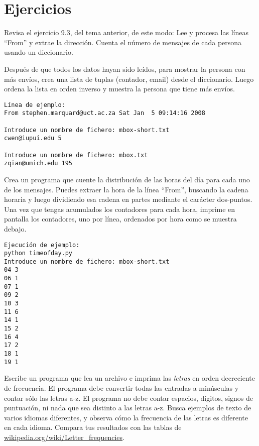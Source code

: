 \section{Ejercicios}

\begin{ex}
Revisa el ejercicio 9.3, del tema anterior, de este modo:
Lee y procesa las líneas ``From'' y extrae la
dirección. Cuenta el número de
mensajes de cada persona usando un diccionario.
	
Después de que todos los datos hayan sido leídos, para mostrar
la persona con más envíos, crea
una lista de tuplas (contador, email) desde el
diccionario. Luego ordena la lista en orden
inverso y muestra la persona que tiene más
envíos.

\beforeverb
\begin{verbatim}
Línea de ejemplo:
From stephen.marquard@uct.ac.za Sat Jan  5 09:14:16 2008

Introduce un nombre de fichero: mbox-short.txt
cwen@iupui.edu 5

Introduce un nombre de fichero: mbox.txt
zqian@umich.edu 195
\end{verbatim}
\afterverb
\end{ex}
\begin{ex}
Crea un programa que cuente la distribución de las horas del día para
cada uno de los mensajes. Puedes extraer la hora de la línea
``From'', buscando la cadena horaria y luego dividiendo esa cadena
en partes mediante el carácter dos-puntos. Una vez que tengas acumulados
los contadores para cada hora, imprime en pantalla los contadores, uno por línea,
ordenados por hora como se muestra debajo.
\beforeverb
\begin{verbatim}
Ejecución de ejemplo:
python timeofday.py
Introduce un nombre de fichero: mbox-short.txt
04 3
06 1
07 1
09 2
10 3
11 6
14 1
15 2
16 4
17 2
18 1
19 1
\end{verbatim}
\afterverb
\end{ex}


\begin{ex}
Escribe un programa que lea un archivo e
imprima las {\em letras} en orden decreciente de frecuencia. El programa
debe convertir todas las entradas a minúsculas y contar sólo las letras a-z.
El programa no debe contar espacios, dígitos, signos de puntuación, ni nada
que sea distinto a las letras a-z.
Busca ejemplos de texto de varios idiomas diferentes, y observa cómo la frecuencia
de las letras es diferente en cada idioma. Compara tus resultados con las tablas de
\url{wikipedia.org/wiki/Letter_frequencies}.


\end{ex}